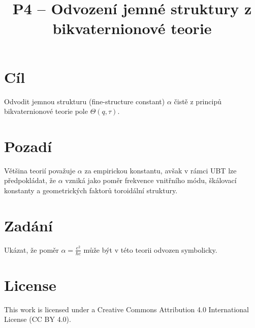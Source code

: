 \documentclass{article}
\title{P4 – Odvození jemné struktury z bikvaternionové teorie}
\author{}
\date{}
\begin{document}
\maketitle


\AlphaDerivationDisclaimer

\section*{Cíl}
Odvodit jemnou strukturu (fine-structure constant) $\alpha$ čistě z principů bikvaternionové teorie pole $\Theta(q, \tau)$.

\section*{Pozadí}
Většina teorií považuje $\alpha$ za empirickou konstantu, avšak v rámci UBT lze předpokládat, že $\alpha$ vzniká jako poměr frekvence vnitřního módu, škálovací konstanty a geometrických faktorů toroidální struktury.

\section*{Zadání}
Ukázat, že poměr $\alpha = \frac{e^2}{\hbar c}$ může být v této teorii odvozen symbolicky.


\section*{License}
This work is licensed under a Creative Commons Attribution 4.0 International License (CC BY 4.0).
\end{document}
